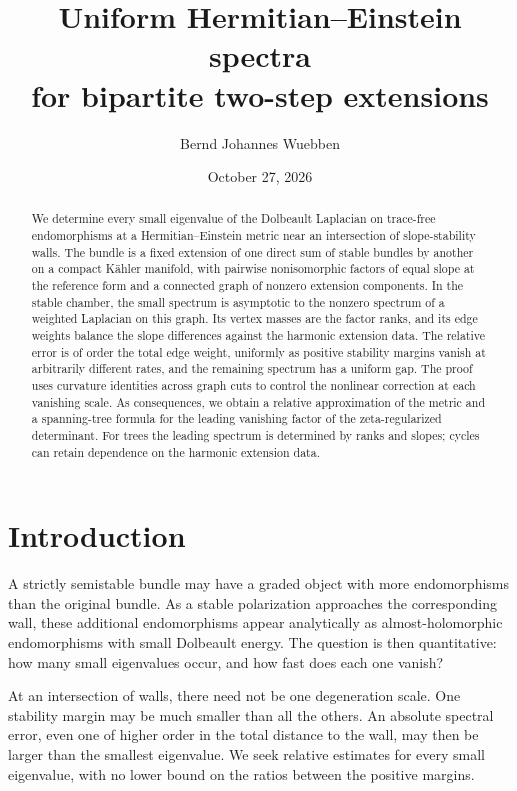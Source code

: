 \documentclass[11pt]{amsart}
\title[Uniform spectra near stability walls]{Uniform Hermitian--Einstein spectra\\for bipartite two-step extensions}
\author{Bernd Johannes Wuebben}
\date{October 27, 2026}
\theoremstyle{definition}
\theoremstyle{remark}
\begin{document}
\begin{abstract}
We determine every small eigenvalue of the Dolbeault Laplacian on
trace-free endomorphisms at a Hermitian--Einstein metric near an
intersection of slope-stability walls. The bundle is a fixed extension
of one direct sum of stable bundles by another on a compact Kähler
manifold, with pairwise nonisomorphic factors of equal slope at the
reference form and a connected graph of nonzero extension components.
In the stable chamber, the small spectrum is asymptotic to the nonzero
spectrum of a weighted Laplacian on this graph. Its vertex masses are
the factor ranks, and its edge weights balance the slope differences
against the harmonic extension data. The relative error is of order the total edge weight, uniformly as
positive stability margins vanish at arbitrarily different rates,
and the remaining spectrum has a uniform gap.
The proof uses curvature identities across graph cuts to control the
nonlinear correction at each vanishing scale. As consequences, we
obtain a relative approximation of the metric and a spanning-tree
formula for the leading vanishing factor of the zeta-regularized
determinant. For trees the leading spectrum is determined by ranks
and slopes; cycles can retain dependence on the harmonic extension data.
\end{abstract}
\maketitle
\enlargethispage{5pt}


\section{Introduction}\label{sec01:introduction}

A strictly semistable bundle may have a graded object with more
endomorphisms than the original bundle. As a stable polarization
approaches the corresponding wall, these additional endomorphisms
appear analytically as almost-holomorphic endomorphisms with small
Dolbeault energy. The question is then quantitative: how many small
eigenvalues occur, and how fast does each one vanish?

At an intersection of walls, there need not be one degeneration scale.
One stability margin may be much smaller than all the others. An
absolute spectral error, even one of higher order in the total
distance to the wall, may then be larger than the smallest eigenvalue.
We seek relative estimates for every small eigenvalue, with no lower
bound on the ratios between the positive margins.
\end{document}
